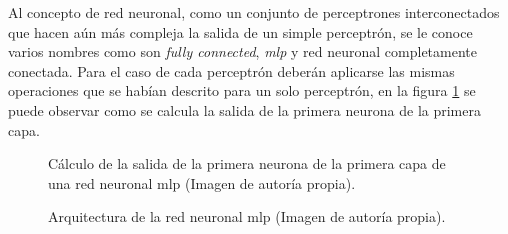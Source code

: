 \par Al concepto de red neuronal, como un conjunto de perceptrones interconectados que hacen aún más compleja la salida de un simple perceptrón, se le conoce varios nombres como son \textit{fully connected}, \textit{\gls{mlp}} y red neuronal completamente conectada. Para el caso de cada perceptrón deberán aplicarse las mismas operaciones que se habían descrito para un solo perceptrón, en la figura \ref{fig:redneuronal1} se puede observar como se calcula la salida de la primera neurona de la primera capa.
		    
\begin{figure}[H]
	\centering
	
	\caption{Cálculo de la salida de la primera neurona de la primera capa de una red neuronal \gls{mlp} (Imagen de autoría propia).}
	\label{fig:redneuronal1}
\end{figure}
		    
		    
\begin{figure}
	\centering
	
	\caption{Arquitectura de la red neuronal \gls{mlp} (Imagen de autoría propia).}
	\label{fig:redneuronal}
\end{figure}
		    
